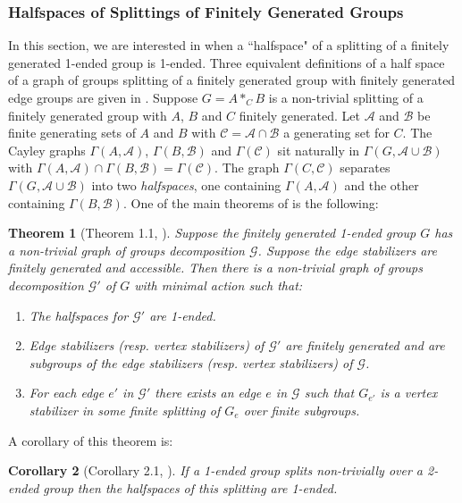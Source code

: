 \documentclass[12pt]{article}
\newtheorem{theorem}{Theorem}[subsection]
\newtheorem{corollary}[theorem]{Corollary}
\begin{document}
\subsubsection{Halfspaces of Splittings of Finitely Generated Groups} \label{Hspace} 

In this section, we are interested in when a ``halfspace" of a splitting of a finitely generated 1-ended group is 1-ended. Three equivalent definitions of a half space of a graph of groups splitting of a finitely generated group with finitely generated edge groups are given in \cite{MS24}. Suppose $G=A\ast_CB$ is a non-trivial splitting of a finitely generated group with $A$, $B$ and $C$ finitely generated. Let $\mathcal A$ and $\mathcal B$ be finite generating sets of $A$ and $B$ with $\mathcal C=\mathcal A\cap \mathcal B$ a generating set for $C$. The Cayley graphs $\Gamma(A,\mathcal A)$, $\Gamma (B, \mathcal B)$ and $\Gamma(\mathcal C)$ sit naturally in $\Gamma (G, \mathcal A\cup \mathcal B)$ with $\Gamma(A,\mathcal A)\cap \Gamma (B, \mathcal B)=\Gamma(\mathcal C)$. 
The graph $\Gamma( C, \mathcal C)$ separates $\Gamma(G,\mathcal A\cup \mathcal B)$ into two {\it halfspaces}, one containing $\Gamma(A,\mathcal A)$ and the other containing $\Gamma(B,\mathcal B)$. One of the main theorems of \cite{MS24} is the following:

\begin{theorem}[Theorem 1.1, \cite{MS24}]\label{Half1}
	Suppose the finitely generated 1-ended group $G$ has a non-trivial graph of groups decomposition $\mathcal G$. Suppose the edge stabilizers are finitely generated and accessible.
	Then there is a non-trivial graph of groups decomposition $\mathcal G'$ of $G$ with minimal action such that:
	\begin{enumerate}
		\item The halfspaces for $\mathcal G'$ are 1-ended.
		\item Edge stabilizers (resp. vertex stabilizers) of $\mathcal G'$ are finitely generated and are subgroups of the edge stabilizers (resp. vertex stabilizers) of $\mathcal G$.
		\item For each edge $e'$ in $\mathcal G'$ there exists an edge $e$ in $\mathcal G$ such that $G_{e'}$ is a vertex stabilizer in some finite splitting of $G_e$ over finite subgroups.
	\end{enumerate}
\end{theorem}

A corollary of this theorem is:

\begin{corollary}[Corollary 2.1, \cite{MS24}]\label{Half2}
	If a 1-ended group splits non-trivially over a 2-ended group then the halfspaces of this splitting are 1-ended.
\end{corollary}
\end{document}
